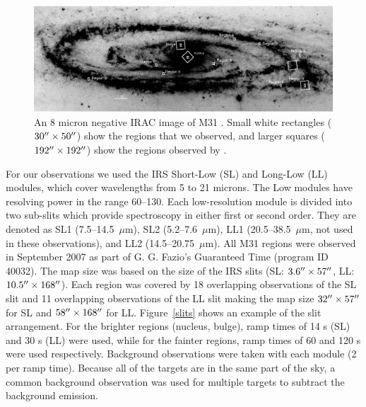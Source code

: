 \begin{figure}
\centering
\includegraphics[scale=0.9]{./fig2.eps}
\caption{An 8 micron negative IRAC image of M31 \citep{Barmby2006lr}. Small white rectangles ($30\hbox{$^{\prime\prime}$}\times50\hbox{$^{\prime\prime}$}$) show the regions that we observed, and larger squares ($192\hbox{$^{\prime\prime}$}\times192\hbox{$^{\prime\prime}$}$) show the regions observed by  \citet{1998Cesarsky}.
\label{m31}
}
\end{figure}


For our observations we used the IRS Short-Low (SL) and Long-Low (LL) modules, which cover wavelengths from 5 to 21 microns. 
The Low modules have resolving power in the range 60--130. Each low-resolution module is divided into two sub-slits 
which provide spectroscopy in either first or second order. They are denoted as SL1 (7.5--14.5~$\mu$m), SL2 (5.2--7.6~$\mu$m),
LL1 (20.5--38.5~$\mu$m, not used in these observations), and LL2 (14.5--20.75~$\mu$m).
All M31 regions were observed in September 2007 as part of G. G. Fazio's Guaranteed Time (program ID 40032). 
The map size was based on the size 
of the IRS slits (SL: $3.6\hbox{$^{\prime\prime}$} \times 57\hbox{$^{\prime\prime}$}$, LL: $10.5\hbox{$^{\prime\prime}$} \times 168\hbox{$^{\prime\prime}$}$). Each region was covered by 18 overlapping observations 
of the SL slit and 11 overlapping observations of the LL slit making the map size $32\hbox{$^{\prime\prime}$} \times 57\hbox{$^{\prime\prime}$}$ for SL and $58\hbox{$^{\prime\prime}$} \times 168\hbox{$^{\prime\prime}$}$ for LL. 
Figure~\ref{slits} shows an example of the slit arrangement. For the brighter regions (nucleus, bulge), ramp times of 14 s (SL) and 30 s (LL) were used, 
while for the fainter regions, ramp times of 60 and 120 s were used respectively. Background observations were taken with each module (2 per ramp time). 
Because all of the targets are in the same part of the sky, a common background observation was used for multiple targets to subtract the background emission. 

